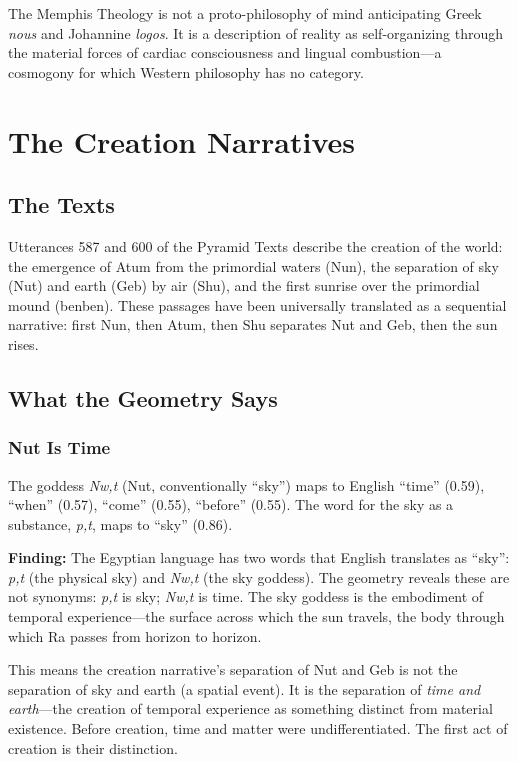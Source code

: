 \documentclass[11pt, a4paper]{article}
\begin{document}
The Memphis Theology is not a proto-philosophy of mind anticipating Greek \textit{nous} and Johannine \textit{logos}. It is a description of reality as self-organizing through the material forces of cardiac consciousness and lingual combustion---a cosmogony for which Western philosophy has no category.

\section{The Creation Narratives}
\label{sec:creation}

\subsection{The Texts}

Utterances 587 and 600 of the Pyramid Texts describe the creation of the world: the emergence of Atum from the primordial waters (Nun), the separation of sky (Nut) and earth (Geb) by air (Shu), and the first sunrise over the primordial mound (benben). These passages have been universally translated as a sequential narrative: first Nun, then Atum, then Shu separates Nut and Geb, then the sun rises.

\subsection{What the Geometry Says}

\subsubsection{Nut Is Time}

The goddess \textit{Nw,t} (Nut, conventionally ``sky'') maps to English ``time'' (0.59), ``when'' (0.57), ``come'' (0.55), ``before'' (0.55). The word for the sky as a substance, \textit{p,t}, maps to ``sky'' (0.86).

{\color{insight}\textbf{Finding:}} The Egyptian language has two words that English translates as ``sky'': \textit{p,t} (the physical sky) and \textit{Nw,t} (the sky goddess). The geometry reveals these are not synonyms: \textit{p,t} is sky; \textit{Nw,t} is time. The sky goddess is the embodiment of temporal experience---the surface across which the sun travels, the body through which Ra passes from horizon to horizon.

This means the creation narrative's separation of Nut and Geb is not the separation of sky and earth (a spatial event). It is the separation of \textit{time and earth}---the creation of temporal experience as something distinct from material existence. Before creation, time and matter were undifferentiated. The first act of creation is their distinction.
\end{document}
